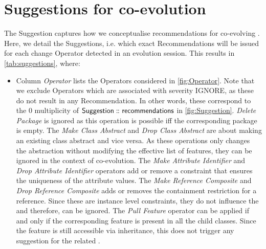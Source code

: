 \section{Suggestions for \viewtype co-evolution} 
\label{sec:Approach}

The \textsf{Suggestion} \metamodel captures how we
conceptualise recommendations for co-evolving \viewtypes. Here, we detail the \textsf{Suggestion}s, i.e. which exact \textsf{Recommendation}s
will be issued for each change \textsf{Operator} detected in an evolution
session. This results in \cref{tab:suggestions}, where:
\begin{itemize}
	\item Column \textsl{Operator} lists the \textsf{Operator}s considered in \cref{fig:Operator}. Note that we exclude \textsf{Operator}s which are associated with severity \textsf{IGNORE}, as these do not result in any \textsf{Recommendation}. In other words, these correspond to the \textsf{0} multiplicity of $\mathsf{Suggestion} \,\colon\!\!\!\colon \mathsf{recommendations}$ in \cref{fig:Suggestion}. \textit{Delete Package} is ignored as this operation is possible iff the corresponding package is empty. The \textit{Make Class Abstract} and \textit{Drop Class Abstract} are about making an existing class abstract and vice versa.   As these operations only changes the abstraction without modifying the effective list of features, they can be ignored in the context of \viewtype co-evolution. The \textit{Make Attribute Identifier} and \textit{Drop Attribute Identifier} operators add or remove a constraint that ensures the uniqueness of the attribute values.  The \textit{Make Reference Composite} and \textit{Drop Reference Composite} adds or removes the containment restriction for a reference. Since these are instance level constraints, they do not influence the \viewtype and therefore, can be ignored. The \textit{Pull Feature} operator can be applied if and only if the corresponding feature is present in all the child classes. Since the feature is still accessible via inheritance, this does not trigger any suggestion for the related \viewtypes.
 

\end{itemize}
